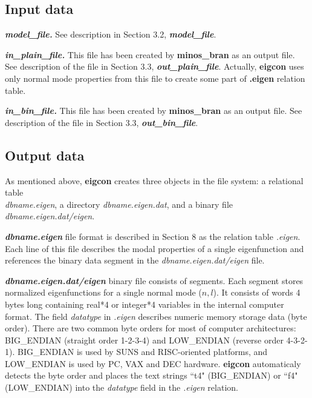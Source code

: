 \subsection {Input data}

\textbf{\large \emph{model\_file.}} See description in Section 3.2, 
\textbf{\emph{model\_file}}.

\noindent \textbf{\large \emph{in\_plain\_file.}}
This file has been created by {\bf minos\_bran} as an output file.
See description of the file in Section 3.3, \textbf{\emph{out\_plain\_file}}.
Actually, {\bf eigcon} uses only normal mode properties from this file to create
some part of {\bf .eigen} relation table.

\noindent \textbf{\large \emph{in\_bin\_file.}}
This file has been created by {\bf minos\_bran} as an output file.
See description of the file in Section 3.3, \textbf{\emph{out\_bin\_file}}.

\subsection {Output data}

As mentioned above, {\bf eigcon} creates three objects in the file system:
a relational table \\
{\it dbname.eigen}, a directory {\it dbname.eigen.dat}, and a
binary file {\it dbname.eigen.dat/eigen}.

\textbf{\large \emph{dbname.eigen}} file format is described in Section 8 as
the relation table {\it .eigen}. Each line of this file describes the modal
properties of a single eigenfunction and references the binary data
segment in the {\it dbname.eigen.dat/eigen} file.

\textbf{\large \emph{dbname.eigen.dat/eigen}} binary file consists of segments.
Each segment stores normalized eigenfunctions for a single normal mode ($n,l$). 
It consists of words 4 bytes long containing real*4 or integer*4 variables
in the internal computer
format. The field {\it datatype} in {\it .eigen} describes numeric memory
storage data (byte order). There are two common byte orders
for most of computer architectures:
BIG\_ENDIAN (straight order 1-2-3-4) and LOW\_ENDIAN (reverse order 4-3-2-1).
BIG\_ENDIAN is used by SUNS and RISC-oriented platforms, and LOW\_ENDIAN is 
used by PC, VAX and DEC hardware. {\bf eigcon} automaticaly detects the byte order
and places the text strings ``t4" (BIG\_ENDIAN) or ``f4" (LOW\_ENDIAN) into the
{\it datatype} field in the {\it .eigen} relation.

